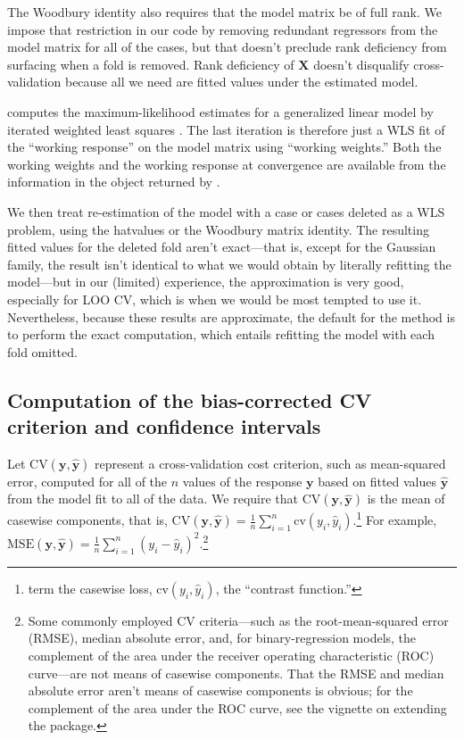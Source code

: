 \documentclass[
]{jss}
\begin{document}
The Woodbury identity also requires that the model matrix be of full
rank. We impose that restriction in our code by removing redundant
regressors from the model matrix for all of the cases, but that doesn't
preclude rank deficiency from surfacing when a fold is removed. Rank
deficiency of \(\mathbf{X}\) doesn't disqualify cross-validation because
all we need are fitted values under the estimated model.

 computes the maximum-likelihood estimates for a generalized
linear model by iterated weighted least squares \citep[see, e.g.,][Sec.
6.12]{FoxWeisberg:2019}. The last iteration is therefore just a WLS fit
of the ``working response'' on the model matrix using ``working
weights.'' Both the working weights and the working response at
convergence are available from the information in the object returned by
.

We then treat re-estimation of the model with a case or cases deleted as
a WLS problem, using the hatvalues or the Woodbury matrix identity. The
resulting fitted values for the deleted fold aren't exact---that is,
except for the Gaussian family, the result isn't identical to what we
would obtain by literally refitting the model---but in our (limited)
experience, the approximation is very good, especially for LOO CV, which
is when we would be most tempted to use it. Nevertheless, because these
results are approximate, the default for the  
method is to perform the exact computation, which entails refitting the
model with each fold omitted.

\subsection{Computation of the bias-corrected CV criterion and
confidence
intervals}\label{computation-of-the-bias-corrected-cv-criterion-and-confidence-intervals}

Let \(\mathrm{CV}(\mathbf{y}, \widehat{\mathbf{y}})\) represent a
cross-validation cost criterion, such as mean-squared error, computed
for all of the \(n\) values of the response \(\mathbf{y}\) based on
fitted values \(\widehat{\mathbf{y}}\) from the model fit to all of the
data. We require that \(\mathrm{CV}(\mathbf{y}, \widehat{\mathbf{y}})\)
is the mean of casewise components, that is,
\(\mathrm{CV}(\mathbf{y}, \widehat{\mathbf{y}}) = \frac{1}{n}\sum_{i=1}^n\mathrm{cv}(y_i, \widehat{y}_i)\).\footnote{\citet{ArlotCelisse:2010}
  term the casewise loss, \(\mathrm{cv}(y_i, \widehat{y}_i)\), the
  ``contrast function.''} For example,
\(\mathrm{MSE}(\mathbf{y}, \widehat{\mathbf{y}}) = \frac{1}{n}\sum_{i=1}^n (y_i - \widehat{y}_i)^2\).\footnote{Some
  commonly employed CV criteria---such as the root-mean-squared error
  (RMSE), median absolute error, and, for binary-regression models, the
  complement of the area under the receiver operating characteristic
  (ROC) curve---are not means of casewise components. That the RMSE and
  median absolute error aren't means of casewise components is obvious;
  for the complement of the area under the ROC curve, see the vignette
  on extending the  package.}
\end{document}
